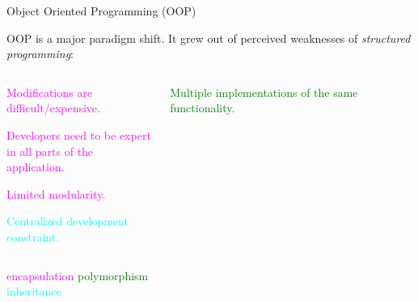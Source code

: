\documentclass[11pt]{beamer}
\newcommand{\bi}{\begin{itemize}}
\newcommand{\ei}{\end{itemize}}
\begin{document}
\begin{frame}{Object Oriented Programming (OOP)}

OOP is a major paradigm shift. It grew out of perceived weaknesses of \emph{structured programming}:
\begin{columns}[onlytextwidth,t]
  \begin{column}{0.48\textwidth}
  \bi
  \item \textcolor{magenta}{Modifications are difficult/expensive.
  \item Developers need to be expert in all parts of the application.
  \item Limited modularity.}
  \item \textcolor{cyan}{Centralized development constraint.}

  \ei
  \end{column}
  \begin{column}{0.48\textwidth}
  \bi
  \item \textcolor{green}{Multiple implementations of the same functionality.}

  \item [\textcolor{white}{\textbullet}] \textcolor{white}{Need to support several data structures that are nearly identical but vary in some systematic ways.
\item [\textcolor{white}{\textbullet}] Difficult to maintain consistency as such structures are extended.}

  \ei

  \end{column}
\end{columns}

  \vfill
  \scriptsize{
\quad \quad \quad \textcolor{magenta}{encapsulation}
\quad \quad \quad \quad \quad \quad 
\quad \quad \quad \quad \quad \quad \quad \textcolor{green}{polymorphism}\\
\quad \quad \quad \textcolor{cyan}{inheritance}
}

\end{frame}
\end{document}

